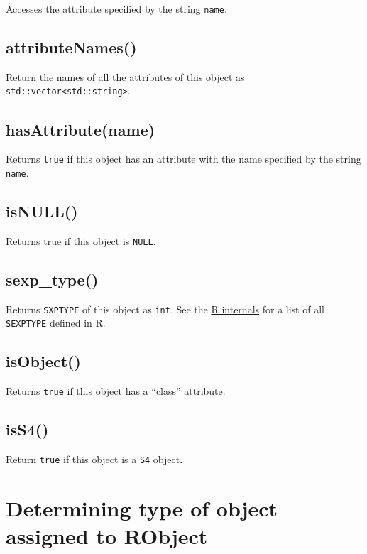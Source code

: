 \documentclass[]{book}
\theoremstyle{definition}
\theoremstyle{definition}
\theoremstyle{remark}
\begin{document}
Accesses the attribute specified by the string \texttt{name}.

\subsection{attributeNames()}\label{attributenames}

Return the names of all the attributes of this object as
\texttt{std::vector\textless{}std::string\textgreater{}}.

\subsection{hasAttribute(name)}\label{hasattributename}

Returns \texttt{true} if this object has an attribute with the name
specified by the string \texttt{name}.

\subsection{isNULL()}\label{isnull}

Returns true if this object is \texttt{NULL}.

\subsection{sexp\_type()}\label{sexp_type}

Returns \texttt{SXPTYPE} of this object as \texttt{int}. See the
\href{https://cran.r-project.org/doc/manuals/r-release/R-ints.html\#SEXPTYPEs}{R
internals} for a list of all \texttt{SEXPTYPE} defined in R.

\subsection{isObject()}\label{isobject}

Returns \texttt{true} if this object has a ``class'' attribute.

\subsection{isS4()}\label{iss4}

Return \texttt{true} if this object is a \texttt{S4} object.

\section{Determining type of object assigned to
RObject}\label{determining-type-of-object-assigned-to-robject}
\end{document}
